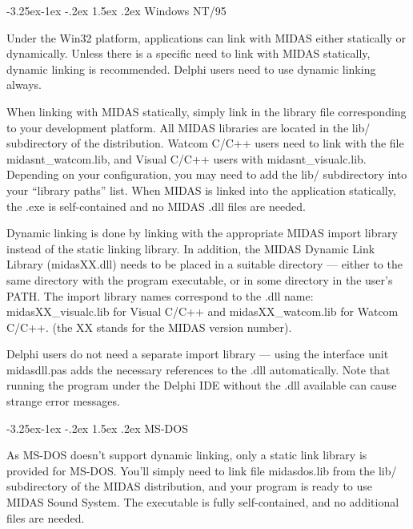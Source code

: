 \documentclass[a4paper,12pt,oneside]{book}
\makeatletter
\renewcommand\subsection{\@startsection{subsection}{2}{-20pt}%
                                     {-3.25ex\@plus -1ex \@minus -.2ex}%
                                     {1.5ex \@plus .2ex}%
                                     {\normalfont\large\bfseries}}
\newcommand{\mFileName}[1]{{\ttfamily #1}}
\makeatother
\begin{document}
\subsection{Windows NT/95}

Under the Win32 platform, applications can link with MIDAS either statically
or dynamically. Unless there is a specific need to link with MIDAS
statically, dynamic linking is recommended. Delphi users need to use dynamic
linking always.

When linking with MIDAS statically, simply link in the library file
corresponding to your development platform. All MIDAS libraries are located
in the \mFileName{lib/} subdirectory of the distribution. Watcom C/C++ users
need to link with the file \mFileName{midasnt\_{}watcom.lib}, and Visual
C/C++ users with \mFileName{midasnt\_{}visualc.lib}. Depending on your
configuration, you may need to add the \mFileName{lib/} subdirectory into
your ``library paths'' list. When MIDAS is linked into the application
statically, the .exe is self-contained and no MIDAS \mFileName{.dll} files
are needed.

Dynamic linking is done by linking with the appropriate MIDAS import library
instead of the static linking library. In addition, the MIDAS Dynamic Link
Library (\mFileName{midasXX.dll}) needs to be placed in a suitable directory
--- either to the same directory with the program executable, or in some
directory in the user's PATH. The import library names correspond to the
\mFileName{.dll} name: \mFileName{midasXX\_{}visualc.lib} for Visual C/C++ and
\mFileName{midasXX\_{}watcom.lib} for Watcom C/C++. (the XX stands for the
MIDAS version number).

Delphi users do not need a separate import library --- using the interface
unit \mFileName{midasdll.pas} adds the necessary references to the
\mFileName{.dll} automatically. Note that running the program under the
Delphi IDE without the \mFileName{.dll} available can cause strange error
messages.



\subsection{MS-DOS}

As MS-DOS doesn't support dynamic linking, only a static link library is
provided for MS-DOS. You'll simply need to link file \mFileName{midasdos.lib}
from the \mFileName{lib/} subdirectory of the MIDAS distribution, and your
program is ready to use MIDAS Sound System. The executable is fully
self-contained, and no additional files are needed.
\end{document}
